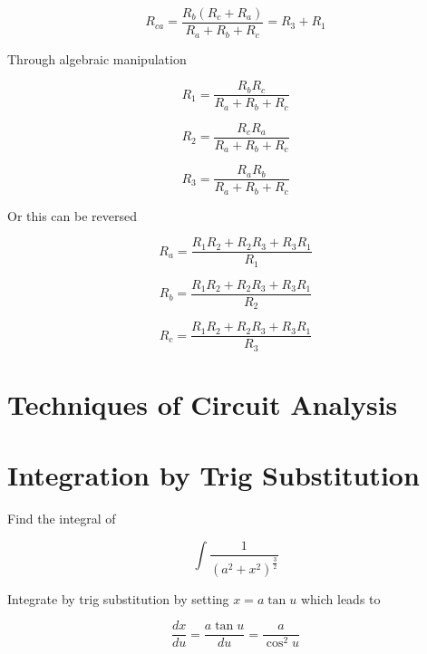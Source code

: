 \documentclass[14pt]{memoir}
\begin{document}
\begin{equation}
R_{ca} = \frac{R_b (R_c + R_a)}{R_a +R_b + R_c} = R_3 + R_1
\end{equation}

Through algebraic manipulation

\begin{equation}
R_1 = \frac{R_b R_c}{R_a + R_b + R_c}
\end{equation}

\begin{equation}
R_2 = \frac{R_c R_a}{R_a + R_b + R_c}
\end{equation}

\begin{equation}
R_3 = \frac{R_a R_b}{R_a + R_b + R_c}
\end{equation}

Or this can be reversed

\begin{equation}
R_a = \frac{R_1 R_2 + R_2 R_3 + R_3 R_1}{R_1}
\end{equation}

\begin{equation}
R_b = \frac{R_1 R_2 + R_2 R_3 + R_3 R_1}{R_2}
\end{equation}

\begin{equation}
R_c = \frac{R_1 R_2 + R_2 R_3 + R_3 R_1}{R_3}
\end{equation}

\chapter{Techniques of Circuit Analysis}

\appendix

\chapter{Integration by Trig Substitution}
\label{sec:trigsub}

Find the integral of 

\begin{equation}
\int \frac{1}{(a^2 + x^2)^{\frac{3}{2}}}
\end{equation}

Integrate by trig substitution by setting $x = a\tan{u}$ which leads to 

\begin{equation}
\frac{dx}{du} = \frac{a \tan{u}}{du} = \frac{a}{\cos^2{u}}
\end{equation}
\end{document}
